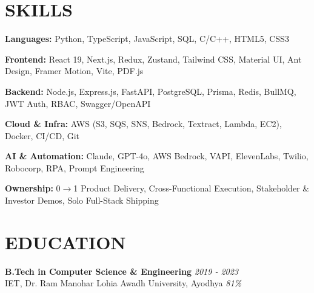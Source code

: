 \documentclass[a4paper,10pt]{article}
\begin{document}
\vspace{3pt}

\section{SKILLS}

\textbf{Languages:} Python, TypeScript, JavaScript, SQL, C/C++, HTML5, CSS3

\textbf{Frontend:} React 19, Next.js, Redux, Zustand, Tailwind CSS, Material UI, Ant Design, Framer Motion, Vite, PDF.js

\textbf{Backend:} Node.js, Express.js, FastAPI, PostgreSQL, Prisma, Redis, BullMQ, JWT Auth, RBAC, Swagger/OpenAPI

\textbf{Cloud \& Infra:} AWS (S3, SQS, SNS, Bedrock, Textract, Lambda, EC2), Docker, CI/CD, Git

\textbf{AI \& Automation:} Claude, GPT-4o, AWS Bedrock, VAPI, ElevenLabs, Twilio, Robocorp, RPA, Prompt Engineering

\textbf{Ownership:} 0$\to$1 Product Delivery, Cross-Functional Execution, Stakeholder \& Investor Demos, Solo Full-Stack Shipping

\vspace{3pt}

\section{EDUCATION}

\textbf{B.Tech in Computer Science \& Engineering} \hfill \textit{2019 - 2023}\\
IET, Dr. Ram Manohar Lohia Awadh University, Ayodhya \hfill \textit{81\%}
\end{document}
